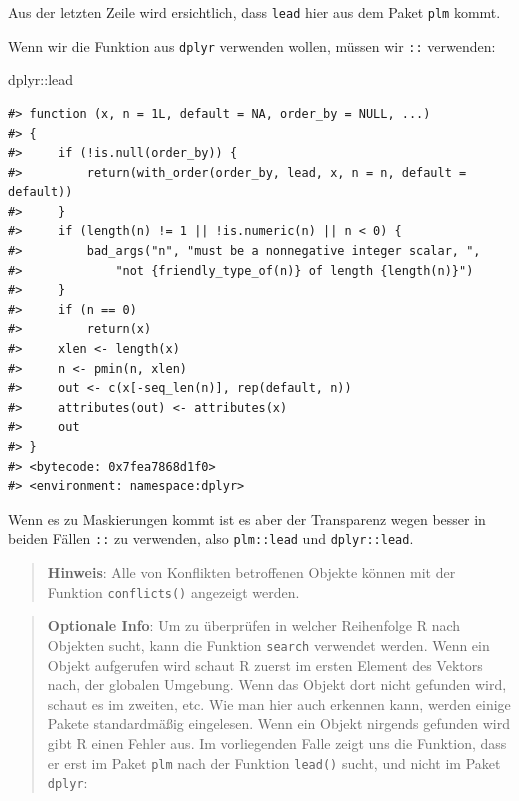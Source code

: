 \documentclass[]{tufte-book}
\newenvironment{Shaded}{}{}
\newcommand{\OperatorTok}[1]{\textcolor[rgb]{0.40,0.40,0.40}{#1}}
\newcommand{\NormalTok}[1]{#1}
\begin{document}
Aus der letzten Zeile wird ersichtlich, dass \texttt{lead} hier aus dem
Paket \texttt{plm} kommt.

Wenn wir die Funktion aus \texttt{dplyr} verwenden wollen, müssen wir
\texttt{::} verwenden:

\begin{Shaded}
\begin{Highlighting}[]
\NormalTok{dplyr}\OperatorTok{::}\NormalTok{lead}
\end{Highlighting}
\end{Shaded}

\begin{verbatim}
#> function (x, n = 1L, default = NA, order_by = NULL, ...) 
#> {
#>     if (!is.null(order_by)) {
#>         return(with_order(order_by, lead, x, n = n, default = default))
#>     }
#>     if (length(n) != 1 || !is.numeric(n) || n < 0) {
#>         bad_args("n", "must be a nonnegative integer scalar, ", 
#>             "not {friendly_type_of(n)} of length {length(n)}")
#>     }
#>     if (n == 0) 
#>         return(x)
#>     xlen <- length(x)
#>     n <- pmin(n, xlen)
#>     out <- c(x[-seq_len(n)], rep(default, n))
#>     attributes(out) <- attributes(x)
#>     out
#> }
#> <bytecode: 0x7fea7868d1f0>
#> <environment: namespace:dplyr>
\end{verbatim}

Wenn es zu Maskierungen kommt ist es aber der Transparenz wegen besser
in beiden Fällen \texttt{::} zu verwenden, also \texttt{plm::lead} und
\texttt{dplyr::lead}.

\begin{quote}
\textbf{Hinweis}: Alle von Konflikten betroffenen Objekte können mit der
Funktion \texttt{conflicts()} angezeigt werden.
\end{quote}

\begin{quote}
\textbf{Optionale Info}: Um zu überprüfen in welcher Reihenfolge R nach
Objekten sucht, kann die Funktion \texttt{search} verwendet werden. Wenn
ein Objekt aufgerufen wird schaut R zuerst im ersten Element des Vektors
nach, der globalen Umgebung. Wenn das Objekt dort nicht gefunden wird,
schaut es im zweiten, etc. Wie man hier auch erkennen kann, werden
einige Pakete standardmäßig eingelesen. Wenn ein Objekt nirgends
gefunden wird gibt R einen Fehler aus. Im vorliegenden Falle zeigt uns
die Funktion, dass er erst im Paket \texttt{plm} nach der Funktion
\texttt{lead()} sucht, und nicht im Paket \texttt{dplyr}:
\end{quote}
\end{document}
